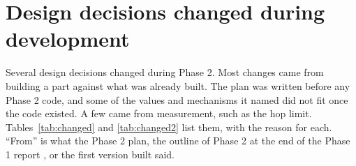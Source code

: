 \section{Design decisions changed during development}
\label{sec:changed}

Several design decisions changed during Phase 2. Most changes came from building a part against what was already built. The plan was written before any Phase 2 code, and some of the values and mechanisms it named did not fit once the code existed. A few came from measurement, such as the hop limit. Tables~\ref{tab:changed} and \ref{tab:changed2} list them, with the reason for each. ``From'' is what the Phase 2 plan, the outline of Phase 2 at the end of the Phase 1 report \cite{phase1}, or the first version built said.

